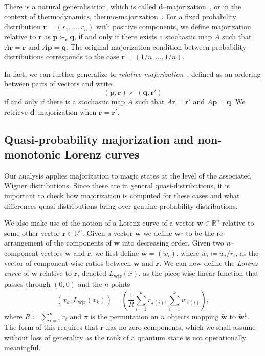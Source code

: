 \documentclass[
onecolumn,
superscriptaddress
]{revtex4-1}
\def\r{\boldsymbol{r}}
\def\w{\boldsymbol{w}}
\def\p{\boldsymbol{p}}
\def\q{\boldsymbol{q}}
\def\d{\boldsymbol{d}}
\def\q{\boldsymbol{q}}
\begin{document}
There is a natural generalisation, which is called $\d$--majorization~\cite{Veinott_1971}, or in the context of thermodynamics, thermo-majorization~\cite{cit:horodecki2013}. For a fixed probability distribution $\r = (r_1, \dots, r_n)$ with positive components, we define majorization relative to $\r$ as $\p \succ_{\r} \q$, if and only if there exists a stochastic map $A$ such that $A\r = \r$ and $A \p = \q$. The original majorization condition between probability distributions corresponds to the case $\r = (1/n, \dots, 1/n)$. 

In fact, we can further generalize to \emph{relative majorization}~\cite{Blackwell_1953, Ruch_1976, ruch_mixing_1978, Renes_2016, Buscemi_2017, Rethinasamy_2020}, defined as an ordering between pairs of vectors and write 
\begin{equation}
	(\p,\r) \succ (\q, \r')
\end{equation}
if and only if there is a stochastic map $A$ such that $A\r = \r'$ and $A\p = \q$. We retrieve $\d$--majorization when $\r = \r'$.

\subsection*{Quasi-probability majorization and non-monotonic Lorenz curves}

Our analysis applies majorization to magic states at the level of the associated Wigner distributions. Since these are in general quasi-distributions, it is important to check how majorization is computed for these cases and what differences quasi-distributions bring over genuine probability distributions.

We also make use of the notion of a Lorenz curve of a vector $\w \in \mathbb{R}^n$ relative to some other vector $\r \in \mathbb{R}^n$. Given a vector $\w$ we define $\w^\downarrow$ to be the re-arrangement of the components of $\w$ into decreasing order. Given two $n$--component vectors $\w$ and $\r$, we first define $\widetilde{\w}=(\widetilde{w}_i)$, where $\widetilde{w}_i \coloneqq w_i/r_i$, as the vector of component-wise ratios between $\w$ and $\r$.
We can now define the \emph{Lorenz curve} of $\w$ relative to $\r$, denoted $L_{\w|\r}(x)$, as the piece-wise linear function that passes through $(0,0)$ and the $n$ points
\begin{equation}\label{eq:lc}
	(x_k,L_{\w|\r}(x_k)) =\left( \frac{1}{R}\sum_{i=1}^k r_{\pi(i)}, \sum_{i=1}^k w_{\pi(i)} \right),
\end{equation}
where $R\coloneqq \sum_{i=1}^n r_i$ and $\pi$ is the permutation on $n$ objects mapping $\widetilde{\w}$ to $\widetilde{\w}^{\downarrow}$. The form of this requires that $\r$ has no zero components, which we shall assume without loss of generality as the rank of a quantum state is not operationally meaningful.
\end{document}

